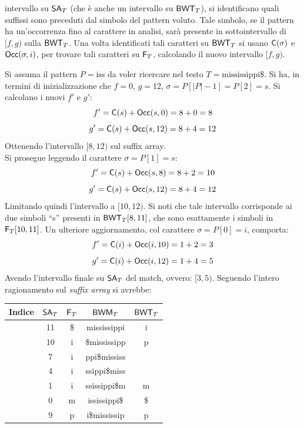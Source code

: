 intervallo su $\mbox{\rm {\sf SA}}_T$ (che è anche un intervallo su $\mbox{\rm {\sf BWT}}_T$), si identificano
quali suffissi sono preceduti dal simbolo del pattern voluto. Tale simbolo, se
il 
pattern ha un'occorrenza fino al carattere in analisi, sarà presente in
sottointervallo di $[f,g)$ sulla $\mbox{\rm {\sf BWT}}_T$. Una volta identificati tali caratteri
su $\mbox{\rm {\sf BWT}}_T$ si usano $\mbox{\rm {\sf C}}(\sigma)$ e $\mbox{\rm {\sf Occ}}(\sigma, i)$, per trovare tali
caratteri su $\mbox{\rm {\sf F}}_T$, calcolando il nuovo intervallo $[f,g)$.
\begin{esempio}
  Si assuma il pattern $P=\mbox{iss}$ da voler ricercare nel testo
  $T=\mbox{mississippi\$}$. 
  Si ha, in termini di inizializzazione che $f=0$, $g=12$,
  $\sigma=P[|P|-1]=P[2]=s$. Si calcolano i nuovi $f'$ e $g'$:
  \[f'=\mbox{\rm {\sf C}}(s)+\mbox{\rm {\sf Occ}}(s, 0)=8+0=8\]
  \[g'=\mbox{\rm {\sf C}}(s)+\mbox{\rm {\sf Occ}}(s, 12)=8+4=12\]
  Ottenendo l'intervallo $[8,12)$ sul suffix array.\\
  Si prosegue leggendo il carattere $\sigma=P[1]=s$:
  \[f'=\mbox{\rm {\sf C}}(s)+\mbox{\rm {\sf Occ}}(s, 8)=8+2=10\]
  \[g'=\mbox{\rm {\sf C}}(s)+\mbox{\rm {\sf Occ}}(s, 12)=8+4=12\]
  Limitando quindi l'intervallo a $[10,12)$. Si noti che tale intervallo
  corrisponde ai due simboli ``s'' presenti in $\mbox{\rm {\sf BWT}}_T[8,11]$, che sono
  esattamente i simboli in $\mbox{\rm {\sf F}}_T[10,11]$.
  Un ulteriore aggiornamento, col carattere $\sigma=P[0]=i$, comporta:
  \[f'=\mbox{\rm {\sf C}}(i)+\mbox{\rm {\sf Occ}}(i, 10)=1+2=3\]
  \[g'=\mbox{\rm {\sf C}}(i)+\mbox{\rm {\sf Occ}}(i, 12)=1+4=5\]
  Avendo l'intervallo finale su $\mbox{\rm {\sf SA}}_T$ del match, ovvero: $[3,5)$.
  Seguendo l'intero ragionamento sul \textit{suffix array} si avrebbe:
  \begin{table}[H]
    \centering
    \scriptsize
    \begin{tabular}{c|c|c|c|c} 
      \textbf{Indice} & $\mbox{\rm {\sf SA}}_T$ & $\mbox{\rm {\sf F}}_T$ & $\mbox{\rm {\sf BWM}}_T$
      & $\mbox{\rm {\sf BWT}}_T$\\ 
      \hline
      {\color{nordred}{0}} & 11 & \$ & {\color{nordred}{\$}}mississippi & i\\
      {\color{nordred}{1}} & 10 & i & {\color{nordred}{i}}\$mississipp & p\\
      {\color{nordred}{2}} & 7 & i & {\color{nordred}{i}}ppi\$mississ
      & {\color{nordgreen}{s}}\\
      {\color{nordred}{3}} & 4 & i & {\color{nordred}{i}}ssippi\$miss
      & {\color{nordgreen}{s}}\\
      {\color{nordred}{4}} & 1 & i & {\color{nordred}{i}}ssissippi\$m & m\\
      {\color{nordred}{5}} & 0 & m & {\color{nordred}{m}}ississippi\$ & \$\\
      {\color{nordred}{6}} & 9 & p & {\color{nordred}{p}}i\$mississip & p\\

\end{tabular}
\end{table}
\end{esempio}
